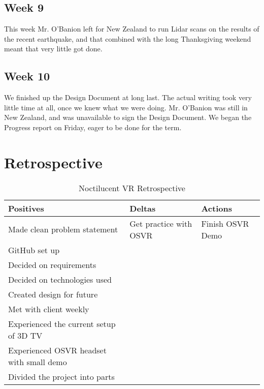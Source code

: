 \documentclass{article}
\begin{document}
\subsection{Week 9}

This week Mr. O'Banion left for New Zealand to run Lidar scans on the results of the recent earthquake, and that combined with the long Thanksgiving weekend meant that very little got done.

\subsection{Week 10}

We finished up the Design Document at long last. The actual writing took very little time at all, once we knew what we were doing. 
Mr. O'Banion was still in New Zealand, and was unavailable to sign the Design Document. 
We began the Progress report on Friday, eager to be done for the term.

\section{Retrospective}

\begin{table}[ht]
\caption{Noctilucent VR Retrospective}
\centering
\begin{tabular}{l l l}
\hline\hline
Positives & Deltas & Actions \\ [0.5ex]
\hline
Made clean problem statement & Get practice with OSVR & Finish OSVR Demo \\
GitHub set up & & \\
Decided on requirements & & \\
Decided on technologies used & & \\
Created design for future &  & \\
Met with client weekly & & \\
Experienced the current setup of 3D TV & & \\
Experienced OSVR headset with small demo & & \\
Divided the project into parts & & \\ [1ex]
\hline
\end{tabular}
\end{table}
\end{document}
